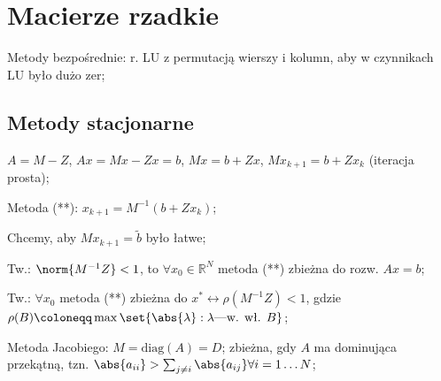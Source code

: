 \section{Macierze rzadkie}

\entry
Metody bezpośrednie: r. LU z permutacją wierszy i kolumn, aby w czynnikach LU było dużo zer;


\subsection{Metody stacjonarne}

\entry
$A=M-Z$, $Ax=Mx-Zx=b$, $Mx=b+Zx$, $Mx_{k+1}=b+Zx_{k}$ (iteracja prosta);

\entry
Metoda (**): $x_{k+1}=M^{-1}(b+Zx_k)$;

\entry
Chcemy, aby $Mx_{k+1}=\tilde{b}$ było łatwe;

\entry
Tw.: $\norm{M^{-1}Z} < 1$, to $\forall x_0 \in \mathbb{R}^N$ metoda (**) zbieżna do rozw. $Ax=b$;

\entry
Tw.: $\forall x_0$ metoda (**) zbieżna do $x^* \leftrightarrow \rho(M^{-1}Z) < 1$, gdzie $\rho(B) \coloneqq \max\set{\abs{\lambda} : \lambda\text{---w. wł. } B}$;

\entry
Metoda Jacobiego: $M=\mathrm{diag}(A) = D$; zbieżna, gdy $A$ ma dominująca przekątną, tzn. $\abs{a_{ii}} > \sum_{j\neq i}\abs{a_{ij}} \forall i=1\ldots N$;



